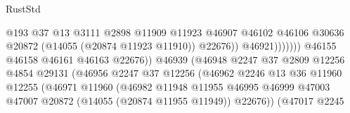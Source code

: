 \begin{lexlean}{RustStd}
\begin{coremodule}
                                                      @193
                                                      @37
                                                      @13
                                                      @3111
                                                      @2898
                                                      @11909
                                                      @11923
                                                      @46907
                                                      @46102
                                                      @46106
                                                      @30636
                                                      @20872
                                                      (@14055 (@20874 @11923 @11910))
                                                      @22676))
                                                  @46921)))))))
                                    @46155
                                    @46158
                                    @46161
                                    @46163
                                    @22676))
                                @46939
                                (@46948
                                  @2247
                                  @37
                                  @2809
                                  @12256
                                  @4854
                                  @29131
                                  (@46956
                                    @2247
                                    @37
                                    @12256
                                    (@46962
                                      @2246
                                      @13
                                      @36
                                      @11960
                                      @12255
                                      (@46971
                                        @11960
                                        (@46982
                                          @11948
                                          @11955
                                          @46995
                                          @46999
                                          @47003
                                          @47007
                                          @20872
                                          (@14055 (@20874 @11955 @11949))
                                          @22676))
                                      (@47017
                                        @2245

\end{coremodule}
\end{lexlean}
